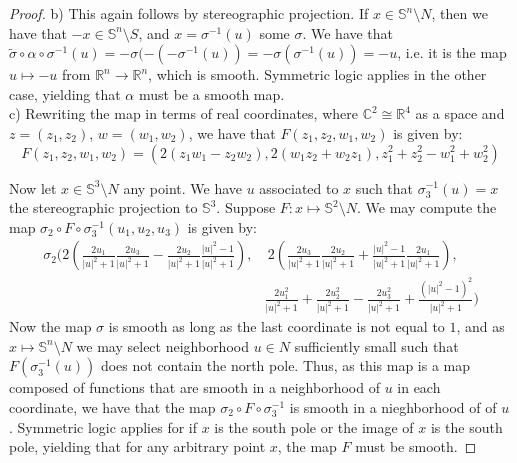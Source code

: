\documentclass{article}
\newcommand{\bb}[1]{\mathbb{#1}}
\newcommand{\iso}{\cong}
\begin{document}
\begin{proof}
  b) This again follows by stereographic projection. If $x \in \bb{S}^{n} \setminus N$, then we have that $-x \in \bb{S}^{n} \setminus S$, and $x = \sigma^{-1}(u)$ some $\sigma$. We have that $\widetilde{\sigma} \circ \alpha \circ \sigma^{-1}(u) = - \sigma (- (-\sigma^{-1}(u)) = -\sigma (\sigma^{-1}(u)) = -u$, i.e. it is the map $u \mapsto -u$ from $\bb{R}^{n} \to \bb{R}^{n}$, which is smooth. Symmetric logic applies in the other case, yielding that $\alpha$ must be a smooth map.\\

  c) Rewriting the map in terms of real coordinates, where $\bb{C}^{2} \iso \bb{R}^{4}$ as a space and $z = (z_{1},z_{2})$, $w = (w_{1},w_{2})$, we have that $F(z_{1},z_{2},w_{1},w_{2})$ is given by:
  \[
    F(z_{1},z_{2},w_{1},w_{2}) = \left(2(z_{1}w_{1} - z_{2}w_{2}), 2(w_{1}z_{2} + w_{2}z_{1}), z_{1}^{2}+z_{2}^{2} - w_{1}^{2} + w_{2}^{2}\right)
  \]

  Now let $x \in \bb{S}^{3} \setminus N$ any point. We have $u$ associated to $x$ such that $\sigma_{3}^{-1}(u) = x$ the stereographic projection to $\bb{S}^{3}$. Suppose $F: x \mapsto \bb{S}^{2} \setminus N$. We may compute the map $\sigma_{2} \circ F \circ \sigma_{3}^{-1}(u_{1},u_{2},u_{3})$ is given by:
  \begin{align*}
\sigma_{2}\Bigg(2\left(\frac{2u_{1}}{|u|^2 + 1}\frac{2u_{3}}{|u|^2 + 1} - \frac{2u_{2}}{|u|^2 + 1}\frac{|u|^{2} - 1}{|u|^2 + 1}\right), & \ 2\left(\frac{2u_{3}}{|u|^2 + 1}\frac{2u_{2}}{|u|^2 + 1} + \frac{|u|^{2} - 1}{|u|^2 + 1}\frac{2u_{1}}{|u|^2 + 1}\right), \\ & \frac{2u_{1}^{2}}{|u|^2 + 1}+\frac{2u_{2}^{2}}{|u|^2 + 1} - \frac{2u_{3}^{2}}{|u|^2 + 1} + \frac{(|u|^{2} - 1)^{2}}{|u|^2 + 1}\Bigg)
  \end{align*}
  Now the map $\sigma$ is smooth as long as the last coordinate is not equal to $1$, and as $x \mapsto \bb{S}^{n} \setminus N$ we may select neighborhood $u \in N$ sufficiently small such that $F(\sigma_{3}^{-1}(u))$ does not contain the north pole. Thus, as this map is a map composed of functions that are smooth in a neighborhood of $u$ in each coordinate, we have that the map $\sigma_{2} \circ F \circ \sigma_{3}^{-1}$ is smooth in a nieghborhood of of $u$. Symmetric logic applies for if $x$ is the south pole or the image of $x$ is the south pole, yielding that for any arbitrary point $x$, the map $F$ must be smooth. 
\end{proof}
\end{document}

